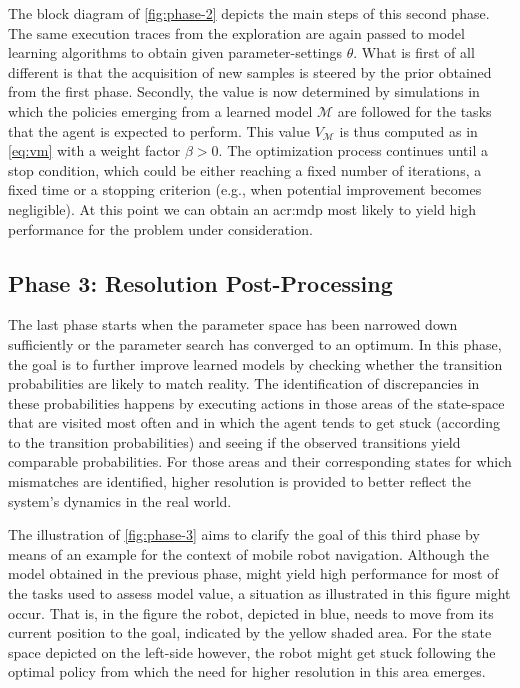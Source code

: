 The block diagram of \autoref{fig:phase-2} depicts the main steps of this second phase.
The same execution traces from the exploration are again passed to model learning algorithms to obtain  given parameter-settings $\theta$.
What is first of all different is that the acquisition of new samples is steered by the prior obtained from the first phase.
Secondly, the value is now determined by simulations in which the policies emerging from a learned model $\mathcal{M}$ are followed for the tasks that the agent is expected to perform.
This value $V_\mathcal{M}$ is thus computed as in \autoref{eq:vm} with a weight factor $\beta > 0$.
The optimization process continues until a stop condition, which could be either reaching a fixed number of iterations, a fixed time or a stopping criterion (e.g., when potential improvement becomes negligible).
At this point we can obtain an \acrshort{acr:mdp} most likely to yield high performance for the problem under consideration.



\subsection{Phase 3: Resolution Post-Processing}
\label{sec:phase-3}

The last phase starts when the parameter space has been narrowed down sufficiently or the parameter search has converged to an optimum.
In this phase, the goal is to further improve learned models by checking whether the transition probabilities are likely to match reality.
The identification of discrepancies in these probabilities happens by executing actions in those areas of the state-space that are visited most often and in which the agent tends to get stuck (according to the transition probabilities) and seeing if the observed transitions yield comparable probabilities.
For those areas and their corresponding states for which mismatches are identified, higher resolution is provided to better reflect the system's dynamics in the real world.

The illustration of \autoref{fig:phase-3} aims to clarify the goal of this third phase by means of an example for the context of mobile robot navigation.
Although the model obtained in the previous phase, might yield high performance for most of the tasks used to assess model value, a situation as illustrated in this figure might occur.
That is, in the figure the robot, depicted in blue, needs to move from its current position to the goal, indicated by the yellow shaded area.
For the state space depicted on the left-side however, the robot might get stuck following the optimal policy from which the need for higher resolution in this area emerges.

